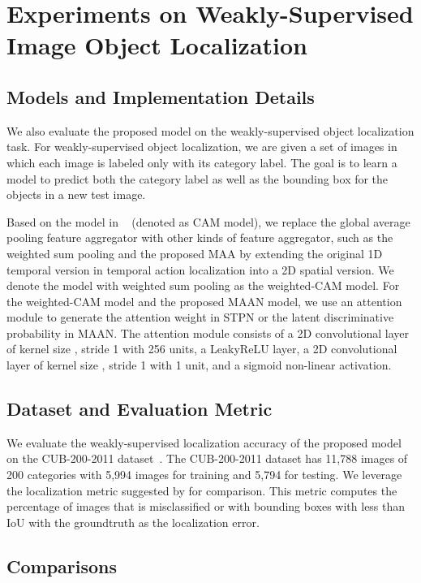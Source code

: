 \documentclass{article} \usepackage{iclr2019_conference,times}
\begin{document}
\section{Experiments on Weakly-Supervised Image Object Localization}\label{exp_det}
\subsection{Models and Implementation Details}
We also evaluate the proposed model on the weakly-supervised object localization task. For weakly-supervised object localization, we are given a set of images in which each image is labeled only with its category label. The goal is to learn a model to predict both the category label as well as the bounding box for the objects in a new test image. 

Based on the model in ~\citep{CAM} (denoted as CAM model), we replace the global average pooling feature aggregator with other kinds of feature aggregator, such as the weighted sum pooling and the proposed MAA by extending the original 1D temporal version in temporal action localization into a 2D spatial version. We denote the model with weighted sum pooling as the weighted-CAM model. For the weighted-CAM model and the proposed MAAN model, we use an attention module to generate the attention weight  in STPN or the latent discriminative probability  in MAAN. The attention module consists of a 2D convolutional layer of kernel size , stride 1 with 256 units, a LeakyReLU layer, a 2D convolutional layer of kernel size , stride 1 with 1 unit, and a sigmoid non-linear activation. 


\subsection{Dataset and Evaluation Metric}
We evaluate the weakly-supervised localization accuracy of the proposed model on the CUB-200-2011 dataset~\citep{WahCUB_200_2011}.  The CUB-200-2011 dataset has 11,788 images of 200 categories with 5,994 images for training and 5,794 for testing. We leverage the localization metric suggested by \citep{russakovsky2015imagenet} for comparison. This metric computes the percentage of images that is misclassified or with bounding boxes with less than  IoU with the groundtruth as the localization error.

\subsection{Comparisons}
\end{document}
